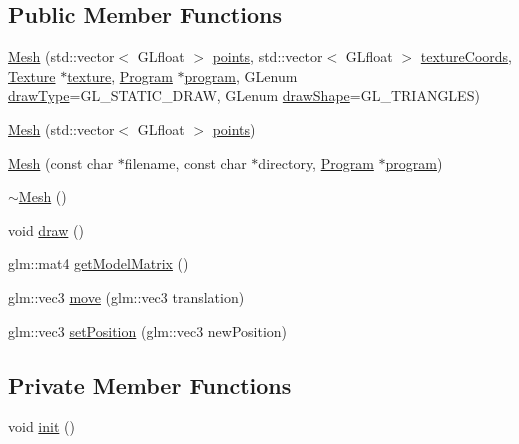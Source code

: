 \subsection*{Public Member Functions}
\begin{DoxyCompactItemize}
\item 
\hyperlink{class_g_g_e_1_1_mesh_af2227f54556d5bae2cdaa84a44e4c890}{Mesh} (std\+::vector$<$ G\+Lfloat $>$ \hyperlink{class_g_g_e_1_1_mesh_ab91ef29f57f9f8b7cddb7f360da63f47}{points}, std\+::vector$<$ G\+Lfloat $>$ \hyperlink{class_g_g_e_1_1_mesh_a7e48e26708078727065dd68e58846503}{texture\+Coords}, \hyperlink{class_g_g_e_1_1_texture}{Texture} $\ast$\hyperlink{class_g_g_e_1_1_mesh_acda1261106fd88be1bfc6a9adaa0e7b5}{texture}, \hyperlink{class_g_g_e_1_1_program}{Program} $\ast$\hyperlink{class_g_g_e_1_1_mesh_aee3bd238788ee7380e8d6770d5f29f2c}{program}, G\+Lenum \hyperlink{class_g_g_e_1_1_mesh_a92c516168dc3400a468cd4dd632287f6}{draw\+Type}=G\+L\+\_\+\+S\+T\+A\+T\+I\+C\+\_\+\+D\+R\+A\+W, G\+Lenum \hyperlink{class_g_g_e_1_1_mesh_a31f188bc943c5586befddc8838bd7c9a}{draw\+Shape}=G\+L\+\_\+\+T\+R\+I\+A\+N\+G\+L\+E\+S)
\item 
\hyperlink{class_g_g_e_1_1_mesh_a4a5408368fd4e8432b6c079432d4d039}{Mesh} (std\+::vector$<$ G\+Lfloat $>$ \hyperlink{class_g_g_e_1_1_mesh_ab91ef29f57f9f8b7cddb7f360da63f47}{points})
\item 
\hyperlink{class_g_g_e_1_1_mesh_a7c3fcda3195e1a67089bd9866d50aae7}{Mesh} (const char $\ast$filename, const char $\ast$directory, \hyperlink{class_g_g_e_1_1_program}{Program} $\ast$\hyperlink{class_g_g_e_1_1_mesh_aee3bd238788ee7380e8d6770d5f29f2c}{program})
\item 
\hyperlink{class_g_g_e_1_1_mesh_a33c847d16eaa0c19ee23d452d51ada24}{$\sim$\+Mesh} ()
\item 
void \hyperlink{class_g_g_e_1_1_mesh_af3ea4a760ffcd84cbb428f859f74778e}{draw} ()
\item 
glm\+::mat4 \hyperlink{class_g_g_e_1_1_mesh_a01cf6257386d96ba81ac1f80c650f0bd}{get\+Model\+Matrix} ()
\item 
glm\+::vec3 \hyperlink{class_g_g_e_1_1_mesh_a40161efa046c5513710bae8db2848d20}{move} (glm\+::vec3 translation)
\item 
glm\+::vec3 \hyperlink{class_g_g_e_1_1_mesh_a96e3bdea0c48b75b858261e0a6ac1eb6}{set\+Position} (glm\+::vec3 new\+Position)
\end{DoxyCompactItemize}
\subsection*{Private Member Functions}
\begin{DoxyCompactItemize}
\item 
void \hyperlink{class_g_g_e_1_1_mesh_aed1ab1e99e0a433d92f3c63db5401853}{init} ()
\end{DoxyCompactItemize}
